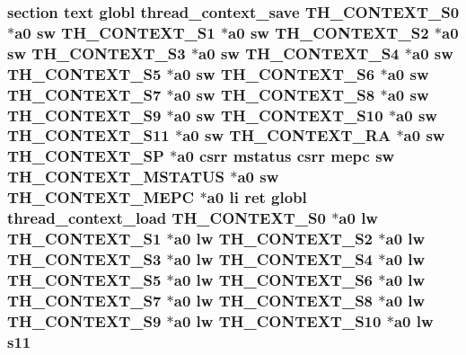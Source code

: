 \hypertarget{riscv_2kpanica_8S_ab719baf1d1b0493dcacbba4f26a58fd0}{
\subsubsection[{s11}]{\setlength{\rightskip}{0pt plus 5cm}section text globl {\bf thread\-\_\-context\-\_\-save} {\bf T\-H\-\_\-\-C\-O\-N\-T\-E\-X\-T\-\_\-\-S0} $\ast${\bf a0} {\bf sw} {\bf T\-H\-\_\-\-C\-O\-N\-T\-E\-X\-T\-\_\-\-S1} $\ast${\bf a0} {\bf sw} {\bf T\-H\-\_\-\-C\-O\-N\-T\-E\-X\-T\-\_\-\-S2} $\ast${\bf a0} {\bf sw} {\bf T\-H\-\_\-\-C\-O\-N\-T\-E\-X\-T\-\_\-\-S3} $\ast${\bf a0} {\bf sw} {\bf T\-H\-\_\-\-C\-O\-N\-T\-E\-X\-T\-\_\-\-S4} $\ast${\bf a0} {\bf sw} {\bf T\-H\-\_\-\-C\-O\-N\-T\-E\-X\-T\-\_\-\-S5} $\ast${\bf a0} {\bf sw} {\bf T\-H\-\_\-\-C\-O\-N\-T\-E\-X\-T\-\_\-\-S6} $\ast${\bf a0} {\bf sw} {\bf T\-H\-\_\-\-C\-O\-N\-T\-E\-X\-T\-\_\-\-S7} $\ast${\bf a0} {\bf sw} {\bf T\-H\-\_\-\-C\-O\-N\-T\-E\-X\-T\-\_\-\-S8} $\ast${\bf a0} {\bf sw} {\bf T\-H\-\_\-\-C\-O\-N\-T\-E\-X\-T\-\_\-\-S9} $\ast${\bf a0} {\bf sw} {\bf T\-H\-\_\-\-C\-O\-N\-T\-E\-X\-T\-\_\-\-S10} $\ast${\bf a0} {\bf sw} {\bf T\-H\-\_\-\-C\-O\-N\-T\-E\-X\-T\-\_\-\-S11} $\ast${\bf a0} {\bf sw} {\bf T\-H\-\_\-\-C\-O\-N\-T\-E\-X\-T\-\_\-\-R\-A} $\ast${\bf a0} {\bf sw} {\bf T\-H\-\_\-\-C\-O\-N\-T\-E\-X\-T\-\_\-\-S\-P} $\ast${\bf a0} csrr {\bf mstatus} csrr {\bf mepc} {\bf sw} {\bf T\-H\-\_\-\-C\-O\-N\-T\-E\-X\-T\-\_\-\-M\-S\-T\-A\-T\-U\-S} $\ast${\bf a0} {\bf sw} {\bf T\-H\-\_\-\-C\-O\-N\-T\-E\-X\-T\-\_\-\-M\-E\-P\-C} $\ast${\bf a0} {\bf li} ret globl {\bf thread\-\_\-context\-\_\-load} {\bf T\-H\-\_\-\-C\-O\-N\-T\-E\-X\-T\-\_\-\-S0} $\ast${\bf a0} {\bf lw} {\bf T\-H\-\_\-\-C\-O\-N\-T\-E\-X\-T\-\_\-\-S1} $\ast${\bf a0} {\bf lw} {\bf T\-H\-\_\-\-C\-O\-N\-T\-E\-X\-T\-\_\-\-S2} $\ast${\bf a0} {\bf lw} {\bf T\-H\-\_\-\-C\-O\-N\-T\-E\-X\-T\-\_\-\-S3} $\ast${\bf a0} {\bf lw} {\bf T\-H\-\_\-\-C\-O\-N\-T\-E\-X\-T\-\_\-\-S4} $\ast${\bf a0} {\bf lw} {\bf T\-H\-\_\-\-C\-O\-N\-T\-E\-X\-T\-\_\-\-S5} $\ast${\bf a0} {\bf lw} {\bf T\-H\-\_\-\-C\-O\-N\-T\-E\-X\-T\-\_\-\-S6} $\ast${\bf a0} {\bf lw} {\bf T\-H\-\_\-\-C\-O\-N\-T\-E\-X\-T\-\_\-\-S7} $\ast${\bf a0} {\bf lw} {\bf T\-H\-\_\-\-C\-O\-N\-T\-E\-X\-T\-\_\-\-S8} $\ast${\bf a0} {\bf lw} {\bf T\-H\-\_\-\-C\-O\-N\-T\-E\-X\-T\-\_\-\-S9} $\ast${\bf a0} {\bf lw} {\bf T\-H\-\_\-\-C\-O\-N\-T\-E\-X\-T\-\_\-\-S10} $\ast${\bf a0} {\bf lw} s11}}\label{riscv_2kpanica_8S_ab719baf1d1b0493dcacbba4f26a58fd0}
